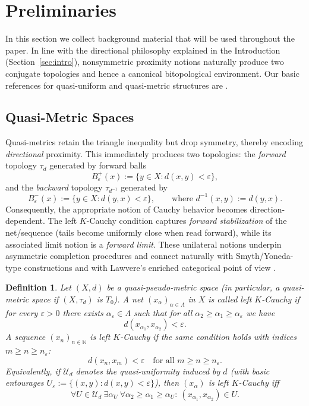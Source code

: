 \documentclass[preprint,12pt]{elsarticle}
\newtheorem{definition}[theorem]{Definition}
\begin{document}
\section{Preliminaries}\label{sec:preliminaries}

In this section we collect background material that will be used
throughout the paper. In line with the directional philosophy explained
in the Introduction (Section~\ref{sec:intro}), nonsymmetric proximity
notions naturally produce two conjugate topologies and hence a canonical
bitopological environment. Our basic references for quasi-uniform and
quasi-metric structures are \cite{FletcherLindgren,Isbell1964,Kunzi2001}.

\subsection{Quasi-Metric Spaces}\label{ssec:qm}

Quasi-metrics retain the triangle inequality but drop symmetry, thereby
encoding \emph{directional} proximity. This immediately produces two
topologies: the \emph{forward} topology $\tau_d$ generated by forward
balls
\[
B^+_\varepsilon(x):=\{y\in X: d(x,y)<\varepsilon\},
\]
and the \emph{backward} topology $\tau_{d^{-1}}$ generated by
\[
B^-_\varepsilon(x):=\{y\in X: d(y,x)<\varepsilon\},
\qquad\text{where } d^{-1}(x,y):=d(y,x).
\]
Consequently, the appropriate notion of Cauchy behavior becomes
direction-dependent. The left $K$-Cauchy condition captures
\emph{forward stabilization} of the net/sequence (tails become uniformly
close when read forward), while its associated limit notion is a
\emph{forward limit}. These unilateral notions underpin asymmetric
completion procedures and connect naturally with Smyth/Yoneda-type
constructions \cite{Kunzi2001,KunziSchellekens2002} and with Lawvere’s
enriched categorical point of view  \cite{Kelly1982,Lawvere1973}.

\begin{definition}\label{def:leftKCauchy}
Let $(X,d)$ be a quasi-pseudo-metric space (in particular, a quasi-metric
space if $(X,\tau_d)$ is $T_0$). A net $(x_\alpha)_{\alpha\in\Lambda}$ in
$X$ is called \emph{left $K$-Cauchy} if for every $\varepsilon>0$ there
exists $\alpha_\varepsilon\in\Lambda$ such that for all
$\alpha_2\ge \alpha_1\ge \alpha_\varepsilon$ we have
\[
d(x_{\alpha_1},x_{\alpha_2})<\varepsilon.
\]
A sequence $(x_n)_{n\in\mathbb{N}}$ is left $K$-Cauchy if the same
condition holds with indices $m\ge n\ge n_\varepsilon$:
\[
d(x_n,x_m)<\varepsilon\quad\text{for all }m\ge n\ge n_\varepsilon.
\]
Equivalently, if $\mathcal{U}_d$ denotes the quasi-uniformity induced by
$d$ (with basic entourages
$U_\varepsilon:=\{(x,y):d(x,y)<\varepsilon\}$), then $(x_\alpha)$ is left
$K$-Cauchy iff
\[
\forall U\in\mathcal{U}_d\ \exists \alpha_U\ \forall
\alpha_2\ge\alpha_1\ge\alpha_U:\ (x_{\alpha_1},x_{\alpha_2})\in U.
\]
\end{definition}
\end{document}
